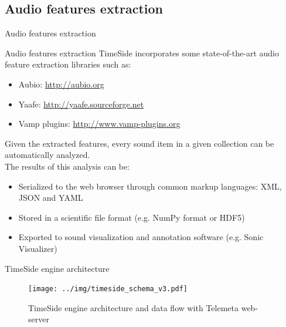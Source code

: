 \documentclass[final, hyperref, table]{beamer}
\begin{document}
\subsection{Audio features extraction}
\begin{frame}{Audio features extraction}
\begin{block}{Audio features extraction}
TimeSide incorporates some state-of-the-art \alert{audio feature extraction libraries} such as:
\vspace{-0.1cm}
\begin{itemize}
\item Aubio:
    \colorbox{yellow!30}{\scriptsize \url{http://aubio.org}}
\vspace{-0.1cm}
\item Yaafe:
    \colorbox{yellow!30}{\scriptsize \url{http://yaafe.sourceforge.net}}
\vspace{-0.1cm}
\item Vamp plugins:  
    \colorbox{yellow!30}{\scriptsize \url{http://www.vamp-plugins.org}}
\end{itemize}

Given the extracted features, every sound item in a given
  collection can be automatically analyzed.\\
The results of this
  analysis can be:
  \begin{itemize}\footnotesize
 \item Serialized to the web browser through common markup languages:
    XML, JSON and YAML
  \item Stored in a scientific file format (e.g. NumPy format or
    HDF5)
  \item Exported to sound visualization and annotation software
    (e.g. Sonic Visualizer)
 
  \end{itemize}
\end{block}

\end{frame}
\begin{frame}{TimeSide engine architecture}
  \begin{figure}[htbp]
  \centering
  \texttt{[image: ../img/timeside\_schema\_v3.pdf]}
  \caption{TimeSide engine architecture and data flow with Telemeta web-server}\label{fig:TimeSide_Archi}
\end{figure}
\end{frame}
  
   
\end{document}

